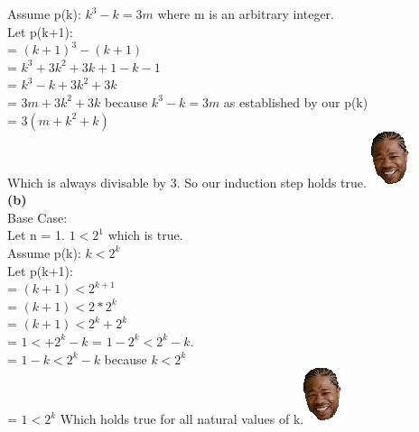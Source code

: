Assume p(k): $k^3-k = 3m$ where m is an arbitrary integer.\\
Let p(k+1):\\
 = $(k + 1)^3 - (k + 1)$\\
 = $k^3 + 3k^2 + 3k + 1 - k - 1$\\
 = $k^3 - k +3k^2 + 3k$\\
 = $3m +3k^2 + 3k$ because $k^3 - k = 3m$ as established by our p(k)\\
 = $3(m +k^2 + k)$\\
 Which is always divisable by 3. So our induction step holds true. \includegraphics[scale=0.70]{billeder/xzibit}\\
\textbf{(b)}\\
Base Case:\\
Let n = 1. $1<2^1$ which is true.\\

Assume p(k): $k < 2^k$\\
Let p(k+1):\\
 = $(k + 1) < 2^{k + 1}$\\
 = $(k + 1) < 2*2^{k}$\\
 = $(k + 1) < 2^{k} + 2^{k}$\\
 = $1 <  + 2^{k} - k$
 = $1 - 2^{k} < 2^{k} - k$.\\
 = $1 - k < 2^{k} - k$ because $k < 2^k$\\
 = $1 < 2^{k}$
  Which holds true for all natural values of k.\includegraphics[scale=0.70]{billeder/xzibit}

